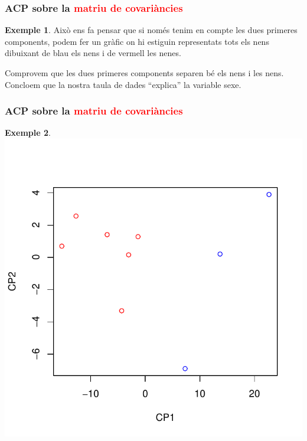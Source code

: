 \documentclass[12pt,t]{beamer}
\newcommand{\red}[1]{\textcolor{red}{#1}}
\theoremstyle{plain}
\theoremstyle{definition}
\newtheorem{exemple}{Exemple}
\begin{document}
\begin{frame}
\frametitle{ACP sobre la \red{matriu de covariàncies}}
\begin{exemple}
Això ens fa pensar que si només tenim en compte les dues primeres components, podem fer un gràfic on hi estiguin 
representats tots els nens dibuixant de blau els nens i de vermell les nenes.
\medskip

Comprovem que les dues primeres components separen bé els nens i les nens. Concloem que la nostra taula de dades 
``explica'' la variable sexe.
\end{exemple}
\end{frame}

\begin{frame}
\frametitle{ACP sobre la \red{matriu de covariàncies}}
\begin{exemple}
\vspace*{-1cm}

\includegraphics{ACP2print-030}
\end{exemple}
\end{frame}
\end{document}
